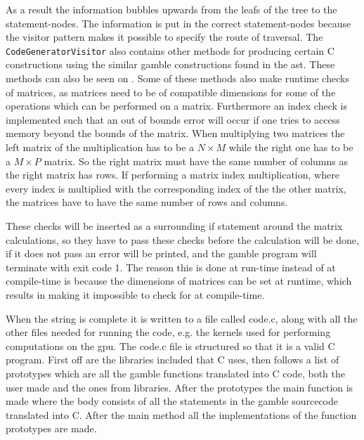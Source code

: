 As a result the information bubbles upwards from the leafs of the tree to the statement-nodes.
The information is put in the correct statement-nodes because the visitor pattern makes it possible to specify the route of traversal.
The \texttt{CodeGeneratorVisitor} also contains other methods for producing certain C constructions using the similar \gls{gamble} constructions found in the \acrshort{ast}.
These methods can also be seen on .
Some of these methods also make runtime checks of matrices, as matrices need to be of compatible dimensions for some of the operations which can be performed on a matrix.
Furthermore an index check is implemented such that an out of bounds error will occur if one tries to access memory beyond the bounds of the matrix.
When multiplying two matrices the left matrix of the multiplication has to be a $ N \times M $ while the right one has to be a $ M \times P $ matrix.
So the right matrix must have the same number of columns as the right matrix has rows.
If performing a matrix index multiplication, where every index is multiplied with the corresponding index of the the other matrix, the matrices have to have the same number of rows and columns. 

These checks will be inserted as a surrounding if statement around the matrix calculations, so they have to pass these checks before the calculation will be done, if it does not pass an error will be printed, and the \gls{gamble} program will terminate with exit code 1.
The reason this is done at run-time instead of at compile-time is because the dimensions of matrices can be set at runtime, which results in making it impossible to check for at compile-time.

When the string is complete it is written to a file called code.c, along with all the other files needed for running the code, e.g. the kernels used for performing computations on the \acrshort{gpu}.
The code.c file is structured so that it is a valid C program.
First off are the libraries included that C uses, then follows a list of prototypes which are all the \gls{gamble} functions translated into C code, both the user made and the ones from libraries.
After the prototypes the main function is made where the body consists of all the statements in the \gls{gamble} sourcecode translated into C.
After the main method all the implementations of the function prototypes are made.
